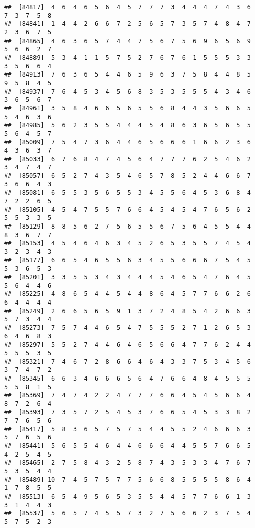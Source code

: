 \documentclass[
]{book}
\begin{document}
\begin{verbatim}
##  [84817]  4  6  4  6  5  6  4  5  7  7  7  3  4  4  4  7  4  3  6  7  3  7  5  8
##  [84841]  1  4  4  2  6  6  7  2  5  6  5  7  3  5  7  4  8  4  7  2  3  6  7  5
##  [84865]  4  6  3  6  5  7  4  4  7  5  6  7  5  6  9  6  5  6  9  5  6  6  2  7
##  [84889]  5  3  4  1  1  5  7  5  2  7  6  7  6  1  5  5  5  3  3  3  5  6  6  4
##  [84913]  7  6  3  6  5  4  4  6  5  9  6  3  7  5  8  4  4  8  5  9  5  8  4  5
##  [84937]  7  6  4  5  3  4  5  6  8  3  5  3  5  5  5  4  3  4  6  3  6  5  6  7
##  [84961]  3  5  8  4  6  6  5  6  5  5  6  8  4  4  3  5  6  6  5  5  4  6  3  6
##  [84985]  5  6  2  3  5  5  4  4  4  5  4  8  6  3  6  5  6  5  5  5  6  4  5  7
##  [85009]  7  5  4  7  3  6  4  4  6  5  6  6  6  1  6  6  2  3  6  4  3  6  3  7
##  [85033]  6  7  6  8  4  7  4  5  6  4  7  7  7  6  2  5  4  6  2  3  4  7  4  7
##  [85057]  6  5  2  7  4  3  5  4  6  5  7  8  5  2  4  4  6  6  7  3  6  6  4  3
##  [85081]  6  5  5  3  5  6  5  5  3  4  5  5  6  4  5  3  6  8  4  7  2  2  6  5
##  [85105]  4  5  4  7  5  5  7  6  6  4  5  4  5  4  7  6  5  6  2  5  5  3  3  5
##  [85129]  8  8  5  6  2  7  5  6  5  5  6  7  5  6  4  5  5  4  4  8  3  6  7  7
##  [85153]  4  5  4  6  4  6  3  4  5  2  6  5  3  5  5  7  4  5  4  3  2  3  4  3
##  [85177]  6  6  5  4  6  5  5  6  3  4  5  5  6  6  6  7  5  4  5  5  3  6  5  3
##  [85201]  3  3  5  5  3  4  3  4  4  4  5  4  6  5  4  7  6  4  5  5  6  4  4  6
##  [85225]  4  8  6  5  4  4  5  4  4  8  6  4  5  7  7  6  6  2  6  6  4  4  4  4
##  [85249]  2  6  6  5  6  5  9  1  3  7  2  4  8  5  4  2  6  6  3  5  7  3  4  4
##  [85273]  7  5  7  4  4  6  5  4  7  5  5  5  2  7  1  2  6  5  3  6  4  6  8  3
##  [85297]  5  5  2  7  4  4  6  4  6  5  6  6  4  7  7  6  2  4  4  5  5  5  3  5
##  [85321]  7  4  6  7  2  8  6  6  4  6  4  3  3  7  5  3  4  5  6  3  7  4  7  2
##  [85345]  6  6  3  4  6  6  6  5  6  4  7  6  6  4  8  4  5  5  5  5  5  8  1  5
##  [85369]  7  4  7  4  2  2  4  7  7  7  6  6  4  5  4  5  6  6  4  8  7  2  6  4
##  [85393]  7  3  5  7  2  5  4  5  3  7  6  6  5  4  5  3  3  8  2  7  7  6  5  6
##  [85417]  5  8  3  6  5  7  5  7  5  4  4  5  5  2  4  6  6  6  3  5  7  6  5  6
##  [85441]  5  6  5  5  4  6  4  4  6  6  6  4  4  5  5  7  6  6  5  4  2  5  4  5
##  [85465]  2  7  5  8  4  3  2  5  8  7  4  3  5  3  3  4  7  6  7  5  3  5  4  4
##  [85489] 10  7  4  5  7  5  7  7  5  6  6  8  5  5  5  5  8  6  4  1  7  8  5  5
##  [85513]  6  5  4  9  5  6  5  3  5  5  4  4  5  7  7  6  6  1  3  3  1  4  4  3
##  [85537]  5  6  5  7  4  5  5  7  3  2  7  5  6  6  2  3  7  5  4  5  7  5  2  3

\end{verbatim}
\end{document}
